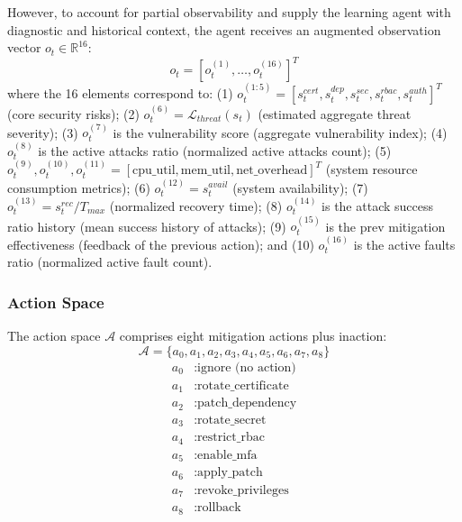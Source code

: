 \documentclass[conference,10pt]{IEEEtran}
\begin{document}
However, to account for partial observability and supply the learning agent with diagnostic and historical context, the agent receives an augmented observation vector $o_t \in \mathbb{R}^{16}$:
\begin{equation}
	o_t = [o_t^{(1)}, \ldots, o_t^{(16)}]^T
\end{equation}
where the 16 elements correspond to: (1) $o_t^{(1:5)} = [s_t^{cert}, s_t^{dep}, s_t^{sec}, s_t^{rbac}, s_t^{auth}]^T$ (core security risks); (2) $o_t^{(6)} = \mathcal{L}_{threat}(s_t)$ (estimated aggregate threat severity); (3) $o_t^{(7)}$ is the vulnerability score (aggregate vulnerability index); (4) $o_t^{(8)}$ is the active attacks ratio (normalized active attacks count); (5) $o_t^{(9)}, o_t^{(10)}, o_t^{(11)} = [\text{cpu\_util}, \text{mem\_util}, \text{net\_overhead}]^T$ (system resource consumption metrics); (6) $o_t^{(12)} = s_t^{avail}$ (system availability); (7) $o_t^{(13)} = s_t^{rec} / T_{max}$ (normalized recovery time); (8) $o_t^{(14)}$ is the attack success ratio history (mean success history of attacks); (9) $o_t^{(15)}$ is the prev mitigation effectiveness (feedback of the previous action); and (10) $o_t^{(16)}$ is the active faults ratio (normalized active fault count).

\subsubsection{Action Space}

The action space $\mathcal{A}$ comprises eight mitigation actions plus inaction:
\begin{equation}
	\mathcal{A} = \{a_0, a_1, a_2, a_3, a_4, a_5, a_6, a_7, a_8\}
\end{equation}
\begin{align}
	a_0 &: \text{ignore (no action)} \nonumber \\
	a_1 &: \text{rotate\_certificate} \nonumber \\
	a_2 &: \text{patch\_dependency} \nonumber \\
	a_3 &: \text{rotate\_secret} \nonumber \\
	a_4 &: \text{restrict\_rbac} \nonumber \\
	a_5 &: \text{enable\_mfa} \nonumber \\
	a_6 &: \text{apply\_patch} \nonumber \\
	a_7 &: \text{revoke\_privileges} \nonumber \\
	a_8 &: \text{rollback} \nonumber
\end{align}
\end{document}
